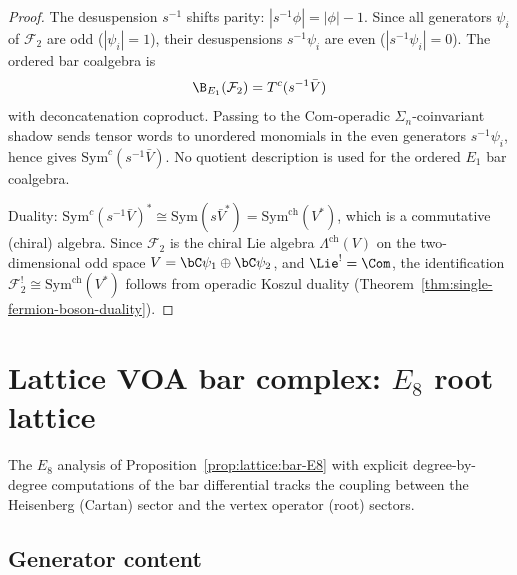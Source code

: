 \begin{proof}
The desuspension $s^{-1}$ shifts parity:
$|s^{-1}\phi| = |\phi| - 1$. Since all generators $\psi_i$ of
$\mathcal{F}_2$ are odd ($|\psi_i| = 1$), their desuspensions
$s^{-1}\psi_i$ are even ($|s^{-1}\psi_i| = 0$). The ordered bar
coalgebra is
\[
\B_{E_1}(\mathcal{F}_2)=T^c(s^{-1}\bar V)
\]
with deconcatenation coproduct. Passing to the Com-operadic
$\Sigma_n$-coinvariant shadow sends tensor words to unordered monomials
in the even generators $s^{-1}\psi_i$, hence gives
$\mathrm{Sym}^c(s^{-1}\bar V)$. No quotient description is used for the
ordered $E_1$ bar coalgebra.

Duality: $\mathrm{Sym}^c(s^{-1}\bar{V})^*
\cong \mathrm{Sym}(s\bar{V}^*) = \mathrm{Sym}^{\mathrm{ch}}(V^*)$,
which is a commutative (chiral) algebra. Since $\mathcal{F}_2$
is the chiral Lie algebra $\Lambda^{\mathrm{ch}}(V)$ on the
two-dimensional odd space $V = \bC\psi_1 \oplus \bC\psi_2$,
and $\Lie^! = \Com$, the identification
$\mathcal{F}_2^! \cong \mathrm{Sym}^{\mathrm{ch}}(V^*)$
follows from operadic Koszul duality
(Theorem~\ref{thm:single-fermion-boson-duality}).
\end{proof}


\section{\texorpdfstring{Lattice VOA bar complex: $E_8$ root lattice}{Lattice VOA bar complex: E8 root lattice}}
\label{sec:E8-lattice-bar}

The $E_8$ analysis of
Proposition~\ref{prop:lattice:bar-E8} with explicit degree-by-degree
computations of the bar differential tracks the coupling between
the Heisenberg (Cartan) sector and the vertex operator (root) sectors.

\subsection{Generator content}

